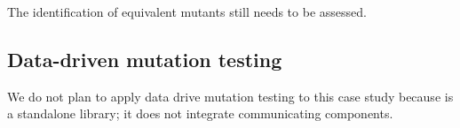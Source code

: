 
% 


The identification of equivalent mutants still needs to be assessed.


\subsection{Data-driven mutation testing}

We do not plan to apply data drive mutation testing to this case study because is a standalone library; it does not integrate communicating components.



